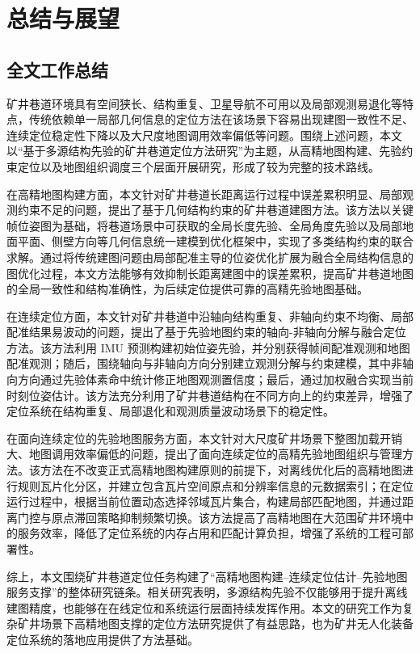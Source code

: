 \chapter{总结与展望}

\section{全文工作总结}

矿井巷道环境具有空间狭长、结构重复、卫星导航不可用以及局部观测易退化等特点，传统依赖单一局部几何信息的定位方法在该场景下容易出现建图一致性不足、连续定位稳定性下降以及大尺度地图调用效率偏低等问题。围绕上述问题，本文以“基于多源结构先验的矿井巷道定位方法研究”为主题，从高精地图构建、先验约束定位以及地图组织调度三个层面开展研究，形成了较为完整的技术路线。

在高精地图构建方面，本文针对矿井巷道长距离运行过程中误差累积明显、局部观测约束不足的问题，提出了基于几何结构约束的矿井巷道建图方法。该方法以关键帧位姿图为基础，将巷道场景中可获取的全局长度先验、全局角度先验以及局部地面平面、侧壁方向等几何信息统一建模到优化框架中，实现了多类结构约束的联合求解。通过将传统建图问题由局部配准主导的位姿优化扩展为融合全局结构信息的图优化过程，本文方法能够有效抑制长距离建图中的误差累积，提高矿井巷道地图的全局一致性和结构准确性，为后续定位提供可靠的高精先验地图基础。

在连续定位方面，本文针对矿井巷道中沿轴向结构重复、非轴向约束不均衡、局部配准结果易波动的问题，提出了基于先验地图约束的轴向-非轴向分解与融合定位方法。该方法利用 IMU 预测构建初始位姿先验，并分别获得帧间配准观测和地图配准观测；随后，围绕轴向与非轴向方向分别建立观测分解与约束建模，其中非轴向方向通过先验体素命中统计修正地图观测置信度；最后，通过加权融合实现当前时刻位姿估计。该方法充分利用了矿井巷道结构在不同方向上的约束差异，增强了定位系统在结构重复、局部退化和观测质量波动场景下的稳定性。

在面向连续定位的先验地图服务方面，本文针对大尺度矿井场景下整图加载开销大、地图调用效率偏低的问题，提出了面向连续定位的高精先验地图组织与管理方法。该方法在不改变正式高精地图构建原则的前提下，对离线优化后的高精地图进行规则瓦片化分区，并建立包含瓦片空间原点和分辨率信息的元数据索引；在定位运行过程中，根据当前位置动态选择邻域瓦片集合，构建局部匹配地图，并通过距离门控与原点滞回策略抑制频繁切换。该方法提高了高精地图在大范围矿井环境中的服务效率，降低了定位系统的内存占用和匹配计算负担，增强了系统的工程可部署性。

综上，本文围绕矿井巷道定位任务构建了“高精地图构建--连续定位估计--先验地图服务支撑”的整体研究链条。相关研究表明，多源结构先验不仅能够用于提升离线建图精度，也能够在在线定位和系统运行层面持续发挥作用。本文的研究工作为复杂矿井场景下高精地图支撑的定位方法研究提供了有益思路，也为矿井无人化装备定位系统的落地应用提供了方法基础。

